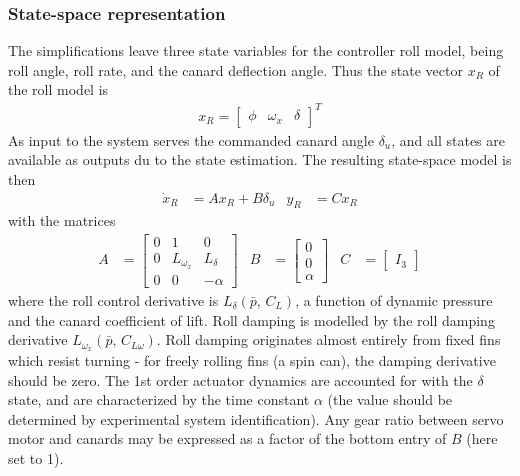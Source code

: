 \subsubsection{State-space representation}
The simplifications leave three state variables for the controller roll model, being roll angle, roll rate, and the canard deflection angle.
Thus the state vector $x_R$ of the roll model is 
\begin{align}
    x_R = \begin{bmatrix} \phi & \omega_x & \delta \end{bmatrix}^T
    \label{eq:controller-model-state}
\end{align}
As input to the system serves the commanded canard angle $\delta_u$, and all states are available as outputs du to the state estimation.
The resulting state-space model is then 
\begin{align}
    \dot x_R &= A x_R + B \delta_u 
    &
    y_R &= C x_R
    \label{eq:controller-model-ss}
\end{align}
with the matrices
\begin{align}    
    A &= \begin{bmatrix}
        0 & 1 & 0 \\
        0 & L_{\omega_x} & L_\delta \\
        0 & 0 & -\alpha
    \end{bmatrix}
    &
    B &= \begin{bmatrix}
        0 \\ 0 \\ \alpha
    \end{bmatrix}
    &
    C &= \begin{bmatrix} I_3 \end{bmatrix}
    \label{eq:controller-model-matrices}
\end{align}
where the roll control derivative is $L_\delta (\bar p,  \,  C_L)$, a function of dynamic pressure and the canard coefficient of lift.
Roll damping is modelled by the roll damping derivative $L_{\omega_x} (\bar p, \, C_{L \omega})$.
Roll damping originates almost entirely from fixed fins which resist turning - for freely rolling fins (a spin can), the damping derivative should be zero.
The 1st order actuator dynamics are accounted for with the $\delta$ state, and are characterized by the time constant $\alpha$ (the value should be determined by experimental system identification).
Any gear ratio between servo motor and canards may be expressed as a factor of the bottom entry of $B$ (here set to 1).